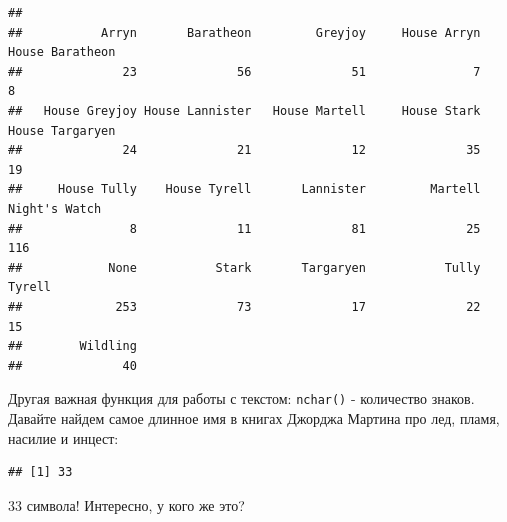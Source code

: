 \documentclass[]{book}
\newenvironment{Shaded}{\begin{snugshade}}{\end{snugshade}}
\newcommand{\KeywordTok}[1]{\textcolor[rgb]{0.13,0.29,0.53}{\textbf{#1}}}
\newcommand{\DataTypeTok}[1]{\textcolor[rgb]{0.13,0.29,0.53}{#1}}
\newcommand{\DecValTok}[1]{\textcolor[rgb]{0.00,0.00,0.81}{#1}}
\newcommand{\StringTok}[1]{\textcolor[rgb]{0.31,0.60,0.02}{#1}}
\newcommand{\CommentTok}[1]{\textcolor[rgb]{0.56,0.35,0.01}{\textit{#1}}}
\newcommand{\OtherTok}[1]{\textcolor[rgb]{0.56,0.35,0.01}{#1}}
\newcommand{\OperatorTok}[1]{\textcolor[rgb]{0.81,0.36,0.00}{\textbf{#1}}}
\newcommand{\NormalTok}[1]{#1}
\begin{document}
\begin{Shaded}
\end{Shaded}

\begin{verbatim}
## 
##           Arryn       Baratheon         Greyjoy     House Arryn House Baratheon 
##              23              56              51               7               8 
##   House Greyjoy House Lannister   House Martell     House Stark House Targaryen 
##              24              21              12              35              19 
##     House Tully    House Tyrell       Lannister         Martell   Night's Watch 
##               8              11              81              25             116 
##            None           Stark       Targaryen           Tully          Tyrell 
##             253              73              17              22              15 
##        Wildling 
##              40
\end{verbatim}

Другая важная функция для работы с текстом: \texttt{nchar()} -
количество знаков. Давайте найдем самое длинное имя в книгах Джорджа
Мартина про лед, пламя, насилие и инцест:

\begin{Shaded}
\end{Shaded}

\begin{verbatim}
## [1] 33
\end{verbatim}

33 символа! Интересно, у кого же это?

\begin{Shaded}
\end{Shaded}
\end{document}
